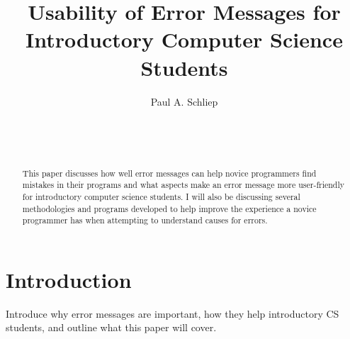\documentclass{sig-alternate}
\begin{document}

\title{Usability of Error Messages for Introductory Computer Science Students}


\author{
\alignauthor
Paul A. Schliep\\
	\\
	\\
	\\
}

\maketitle
\begin{abstract}
This paper discusses how well error messages can help novice programmers find mistakes in their programs and what aspects make an error message more user-friendly for introductory computer science students. I will also be discussing several methodologies and programs developed to help improve the experience a novice programmer has when attempting to understand causes for errors.

\end{abstract}



\section{Introduction}\label{intro}
Introduce why error messages are important, how they help introductory CS students, and outline what this paper will cover.

\end{document}
